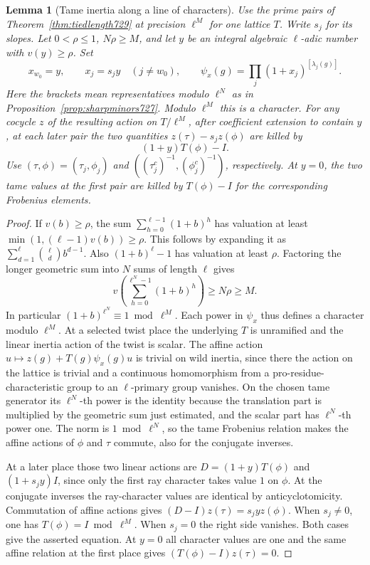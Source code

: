 \documentclass[a4paper,11pt]{article}
\newtheorem{lemma}[proposition]{Lemma}
\theoremstyle{definition}
\theoremstyle{remark}
\numberwithin{equation}{section}
\begin{document}
\begin{lemma}[Tame inertia along a line of characters]\leavevmode
\label{lem:linetame730}
Use the prime pairs of Theorem~\ref{thm:tiedlength729} at precision
\(\ell^M\) for one lattice \(T\). Write \(s_j\) for its slopes.
Let \(0<\rho\le1\), \(N\rho\ge M\), and let \(y\) be an integral
algebraic \(\ell\)-adic number with \(v(y)\ge\rho\). Set
\[
          x_{w_0}=y,\qquad x_j=s_j y\quad(j\ne w_0),\qquad
          \psi_x(g)=\prod_j(1+x_j)^{[\lambda_j(g)]}.
\]
Here the brackets mean representatives modulo \(\ell^N\) as in
Proposition~\ref{prop:sharpminors727}. Modulo \(\ell^M\) this is
a character. For any cocycle \(z\) of the resulting action on
\(T/\ell^M\), after coefficient extension to contain \(y\), at each
later pair the two quantities
\(z(\tau)-s_j z(\phi)\) are killed by
\[
                          (1+y)T(\phi)-I .
\]
Use \((\tau,\phi)=(\tau_j,\phi_j)\) and
\(((\tau_j^c)^{-1},(\phi_j^c)^{-1})\), respectively. At \(y=0\),
the two tame values at the first pair are killed by \(T(\phi)-I\)
for the corresponding Frobenius elements.
\end{lemma}
\begin{proof}
If \(v(b)\ge\rho\), the sum \(\sum_{h=0}^{\ell-1}(1+b)^h\) has
valuation at least \(\min(1,(\ell-1)v(b))\ge\rho\).
This follows by expanding it as
\(\sum_{d=1}^{\ell}\binom{\ell}{d}b^{d-1}\).
Also \((1+b)^\ell-1\) has valuation at least \(\rho\). Factoring
the longer geometric sum into \(N\) sums of length \(\ell\) gives
\[
        v\left(\sum_{h=0}^{\ell^N-1}(1+b)^h\right)\ge N\rho\ge M .
\]
In particular \((1+b)^{\ell^N}\equiv1\bmod\ell^M\).
Each power in \(\psi_x\) thus defines a character modulo \(\ell^M\).
At a selected twist place the underlying \(T\) is unramified and the
linear inertia action of the twist is scalar. The affine action
\(u\mapsto z(g)+T(g)\psi_x(g)u\) is trivial on wild inertia,
since there the action on the lattice is trivial and a continuous
homomorphism from a pro-residue-characteristic group to an
\(\ell\)-primary group vanishes. On the chosen tame generator its
\(\ell^N\)-th power is the identity because the translation part is
multiplied by the geometric sum just estimated, and the scalar part
has \(\ell^N\)-th power one. The norm is \(1\bmod\ell^N\), so the
tame Frobenius relation makes the affine actions of \(\phi\) and
\(\tau\) commute, also for the conjugate inverses.

At a later place those two linear actions are
\(D=(1+y)T(\phi)\) and \((1+s_jy)I\), since only the first ray
character takes value \(1\) on \(\phi\). At the conjugate inverses
the ray-character values are identical by anticyclotomicity.
Commutation of affine actions gives
\((D-I)z(\tau)=s_jy z(\phi)\). When \(s_j\ne0\), one has
\(T(\phi)=I\bmod\ell^M\). When \(s_j=0\) the right side vanishes.
Both cases give the asserted equation. At \(y=0\) all character
values are one and the same affine relation at the first place gives
\((T(\phi)-I)z(\tau)=0\).
\end{proof}
\end{document}
